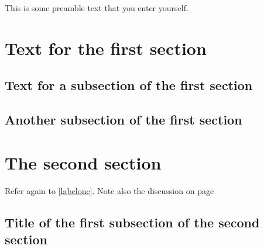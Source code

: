 \documentclass{article}
\begin{document}
This is some preamble text that you enter yourself.

\section{Text for the first section}
\lipsum[1]

\subsection{Text for a subsection of the first section}
\lipsum[2-3]
\label{labelone}

\subsection{Another subsection of the first section}
\lipsum[4-5]
\label{labeltwo}

\section{The second section}
\lipsum[6]

Refer again to \ref{labelone}.
Note also the discussion on page \pageref{labeltwo}

\subsection{Title of the first subsection of the second section}
\lipsum[7]
\end{document}
